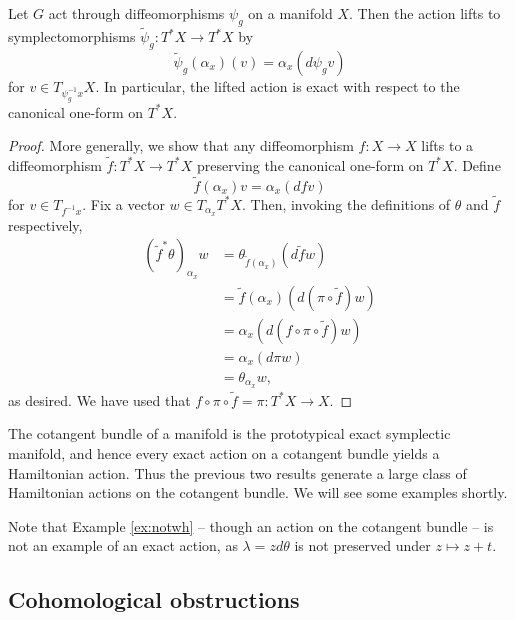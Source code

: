 \documentclass{amsart}
\begin{document}
\begin{lemma}
    Let $G$ act through diffeomorphisms $\psi_g$ on a manifold $X$. Then the action
    lifts to symplectomorphisms $\tilde \psi_g:T^*X\to T^*X$ by
    \begin{equation*}
        \tilde\psi_g(\alpha_x)(v) = \alpha_x(d\psi_gv)
    \end{equation*}
    for $v\in T_{\psi_g^{-1}x}X$. In particular, the lifted action is exact with respect
    to the canonical one-form on $T^*X$.
    \label{lem:liftexact}
\end{lemma}
\begin{proof}
    More generally, we show that any diffeomorphism $f:X\to X$ lifts to a diffeomorphism 
    $\tilde f:T^*X\to T^*X$ preserving the canonical one-form on $T^*X$. Define
    \begin{equation*}
        \tilde f(\alpha_x)v = \alpha_x(df v)
    \end{equation*}
    for $v\in T_{f^{-1}x}$. Fix a vector $w\in T_{\alpha_x}T^*X$. Then, invoking the definitions
    of $\theta$ and $\tilde f$ respectively,
    \begin{align*}
        (\tilde f^*\theta)_{\alpha_x}w &= \theta_{\tilde f(\alpha_x)}(d\tilde fw)\\
        &= \tilde f(\alpha_x)(d(\pi\circ\tilde f)w)\\
        &= \alpha_x(d(f\circ \pi\circ \tilde f)w)\\
        &= \alpha_x(d\pi w)\\
        &= \theta_{\alpha_x}w,
    \end{align*}
    as desired. We have used that $f\circ\pi\circ\tilde f=\pi:T^*X\to X$.
\end{proof}

The cotangent bundle of a manifold is the prototypical exact symplectic manifold, and hence
every exact action on a cotangent bundle yields a Hamiltonian action. Thus the previous two
results generate a large class of Hamiltonian actions on the cotangent bundle. We will see
some examples shortly.

Note that Example
\ref{ex:notwh} -- though an action on the cotangent bundle -- is not an example of an
exact action, as $\lambda=zd\theta$ is not preserved under $z\mapsto z+t$.

\subsection{Cohomological obstructions}
\end{document}
